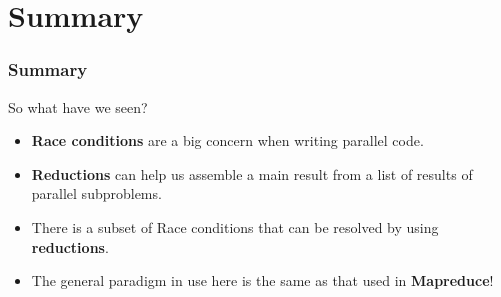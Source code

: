 \documentclass[table]{beamer}
\begin{document}
\section{Summary}
\begin{frame}
    \frametitle{Summary}
    So what have we seen?
    \begin{itemize}
        \item<1-> \textbf{Race conditions} are a big concern when writing 
        parallel code.
        \item<2-> \textbf{Reductions} can help us assemble a main result 
        from a list of results of parallel subproblems.
        \item<3-> There is a subset of Race conditions that can be resolved 
        by using \textbf{reductions}.
        \item<4-> The general paradigm in use here is the same as that used 
        in \textbf{Mapreduce}!
    \end{itemize}
\end{frame}
\end{document}
